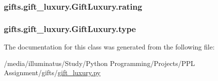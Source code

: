 \subsubsection[{\texorpdfstring{rating}{rating}}]{\setlength{\rightskip}{0pt plus 5cm}gifts.\+gift\+\_\+luxury.\+Gift\+Luxury.\+rating}\hypertarget{classgifts_1_1gift__luxury_1_1_gift_luxury_ae198823fa402656c7df8d3730214f9f4}{}\label{classgifts_1_1gift__luxury_1_1_gift_luxury_ae198823fa402656c7df8d3730214f9f4}
\subsubsection[{\texorpdfstring{type}{type}}]{\setlength{\rightskip}{0pt plus 5cm}gifts.\+gift\+\_\+luxury.\+Gift\+Luxury.\+type}\hypertarget{classgifts_1_1gift__luxury_1_1_gift_luxury_a396a3f85420d5b5e0809a7fc51cbd37a}{}\label{classgifts_1_1gift__luxury_1_1_gift_luxury_a396a3f85420d5b5e0809a7fc51cbd37a}


The documentation for this class was generated from the following file\+:\begin{DoxyCompactItemize}
\item 
/media/illuminatus/\+Study/\+Python Programming/\+Projects/\+P\+P\+L Assignment/gifts/\hyperlink{gift__luxury_8py}{gift\+\_\+luxury.\+py}\end{DoxyCompactItemize}
